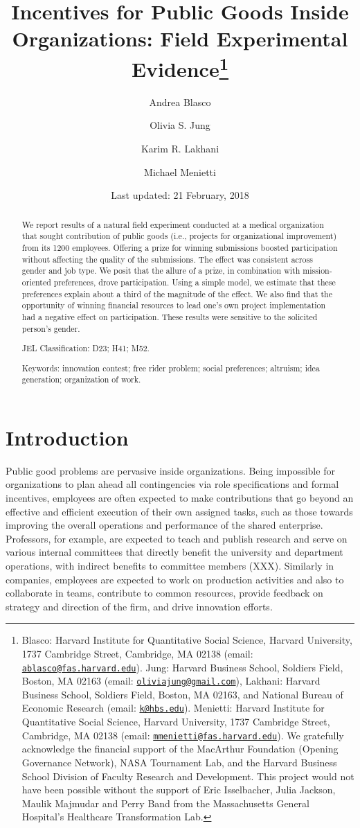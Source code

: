\documentclass[12pt, titlepage]{article}
\title{Incentives for Public Goods Inside Organizations: Field Experimental
Evidence\thanks{Blasco: Harvard Institute for Quantitative Social Science, Harvard
University, 1737 Cambridge Street, Cambridge, MA 02138 (email:
\href{mailto:ablasco@fas.harvard.edu}{\nolinkurl{ablasco@fas.harvard.edu}}).
Jung: Harvard Business School, Soldiers Field, Boston, MA 02163 (email:
\href{mailto:oliviajung@gmail.com}{\nolinkurl{oliviajung@gmail.com}}),
Lakhani: Harvard Business School, Soldiers Field, Boston, MA 02163, and
National Bureau of Economic Research (email:
\href{mailto:k@hbs.edu}{\nolinkurl{k@hbs.edu}}). Menietti: Harvard
Institute for Quantitative Social Science, Harvard University, 1737
Cambridge Street, Cambridge, MA 02138 (email:
\href{mailto:mmenietti@fas.harvard.edu}{\nolinkurl{mmenietti@fas.harvard.edu}}).
We gratefully acknowledge the financial support of the MacArthur
Foundation (Opening Governance Network), NASA Tournament Lab, and the
Harvard Business School Division of Faculty Research and Development.
This project would not have been possible without the support of Eric
Isselbacher, Julia Jackson, Maulik Majmudar and Perry Band from the
Massachusetts General Hospital's Healthcare Transformation Lab.}}
\author{Andrea Blasco \and Olivia S. Jung \and Karim R. Lakhani \and Michael Menietti}
\date{Last updated: 21 February, 2018}
\begin{document}
\maketitle
\begin{abstract}
We report results of a natural field experiment conducted at a medical
organization that sought contribution of public goods (i.e., projects
for organizational improvement) from its 1200 employees. Offering a
prize for winning submissions boosted participation without affecting
the quality of the submissions. The effect was consistent across gender
and job type. We posit that the allure of a prize, in combination with
mission-oriented preferences, drove participation. Using a simple model,
we estimate that these preferences explain about a third of the
magnitude of the effect. We also find that the opportunity of winning
financial resources to lead one's own project implementation had a
negative effect on participation. These results were sensitive to the
solicited person's gender.

\smallskip\noindent 
JEL Classification: D23; H41; M52.

\smallskip\noindent 
Keywords: innovation contest; free rider problem; social preferences; altruism; idea generation; organization of work.
\end{abstract}


\clearpage
\tableofcontents
\setcounter{tocdepth}{2}
\clearpage

\section{Introduction}\label{introduction}

Public good problems are pervasive inside organizations. Being
impossible for organizations to plan ahead all contingencies via role
specifications and formal incentives, employees are often expected to
make contributions that go beyond an effective and efficient execution
of their own assigned tasks, such as those towards improving the overall
operations and performance of the shared enterprise. Professors, for
example, are expected to teach and publish research and serve on various
internal committees that directly benefit the university and department
operations, with indirect benefits to committee members (XXX). Similarly
in companies, employees are expected to work on production activities
and also to collaborate in teams, contribute to common resources,
provide feedback on strategy and direction of the firm, and drive
innovation efforts.
\end{document}
